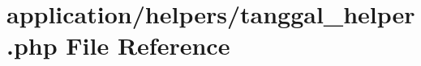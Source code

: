 \hypertarget{tanggal__helper_8php}{}\section{application/helpers/tanggal\+\_\+helper.php File Reference}
\label{tanggal__helper_8php}
